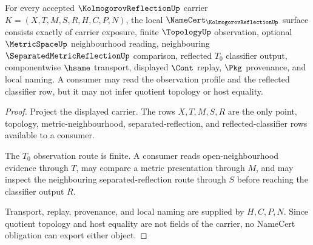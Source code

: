 \begin{theorem}
\label{thm:kolmogorov-reflection-namecert-obligations}
For every accepted $\KolmogorovReflectionUp$ carrier $K=(X,T,M,S,R,H,C,P,N)$, the local $\NameCert_{\KolmogorovReflectionUp}$ surface consists exactly of carrier exposure, finite $\TopologyUp$ observation, optional $\MetricSpaceUp$ neighbourhood reading, neighbouring $\SeparatedMetricReflectionUp$ comparison, reflected $T_0$ classifier output, componentwise $\hsame$ transport, displayed $\Cont$ replay, $\Pkg$ provenance, and local naming. A consumer may read the observation profile and the reflected classifier row, but it may not infer quotient topology or host equality.
\end{theorem}
\begin{proof}
Project the displayed carrier. The rows $X,T,M,S,R$ are the only point, topology, metric-neighbourhood, separated-reflection, and reflected-classifier rows available to a consumer.

The $T_0$ observation route is finite. A consumer reads open-neighbourhood evidence through $T$, may compare a metric presentation through $M$, and may inspect the neighbouring separated-reflection route through $S$ before reaching the classifier output $R$.

Transport, replay, provenance, and local naming are supplied by $H,C,P,N$. Since quotient topology and host equality are not fields of the carrier, no NameCert obligation can export either object.
\end{proof}

